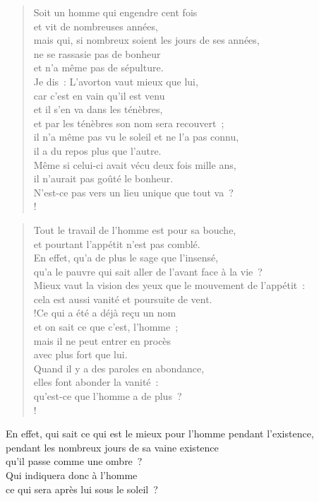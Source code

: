 \documentclass[french,twoside]{book} %
\def\mednobreak{\ifdim\lastskip<\medskipamount
  \removelastskip\nopagebreak\medskip\fi}
\newcommand{\labelblock}[1]{\medbreak{\noindent\color{rubric}\bfseries #1}\par\mednobreak}
\begin{document}
\begin{verse}
Soit un homme qui engendre cent fois \\
et vit de nombreuses années, \\
mais qui, si nombreux soient les jours de ses années, \\
ne se rassasie pas de bonheur \\
et n’a même pas de sépulture. \\
Je dis : L’avorton vaut mieux que lui,\\
car c’est en vain qu’il est venu \\
et il s’en va dans les ténèbres, \\
et par les ténèbres son nom sera recouvert ;\\
il n’a même pas vu le soleil et ne l’a pas connu, \\
il a du repos plus que l’autre.\\
Même si celui-ci avait vécu deux fois mille ans, \\
il n’aurait pas goûté le bonheur. \\
N’est-ce pas vers un lieu unique que tout va ?\\!
\end{verse}

\labelblock{L’homme demeure insatisfait}


\begin{verse}
Tout le travail de l’homme est pour sa bouche, \\
et pourtant l’appétit n’est pas comblé.\\
En effet, qu’a de plus le sage que l’insensé, \\
qu’a le pauvre qui sait aller de l’avant face à la vie ?\\
Mieux vaut la vision des yeux que le mouvement de l’appétit : \\
cela est aussi vanité et poursuite de vent.\\!Ce qui a été a déjà reçu un nom \\
et on sait ce que c’est, l’homme ; \\
mais il ne peut entrer en procès \\
avec plus fort que lui.\\
Quand il y a des paroles en abondance, \\
elles font abonder la vanité : \\
qu’est-ce que l’homme a de plus ?\\!
\end{verse}
En effet, qui sait ce qui est le mieux pour l’homme pendant l’existence, \\
pendant les nombreux jours de sa vaine existence \\
qu’il passe comme une ombre ? \\
Qui indiquera donc à l’homme \\
ce qui sera après lui sous le soleil ?\\
\end{document}
